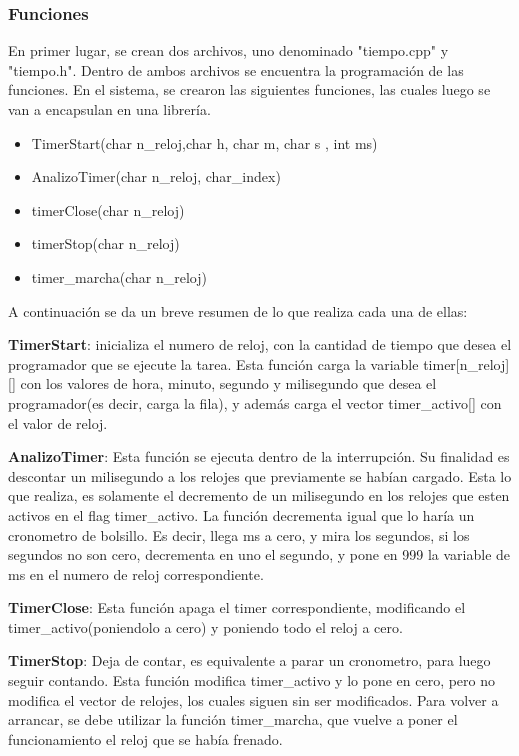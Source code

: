 \subsubsection{Funciones}

En primer lugar, se crean dos archivos, uno denominado "tiempo.cpp"  y "tiempo.h". Dentro de ambos archivos se encuentra la programación de las funciones. En el sistema, se crearon las siguientes funciones, las cuales luego se van a encapsulan en una librería.  

\begin{itemize}
\item TimerStart(char n\_reloj,char h, char m, char s , int ms)
\item AnalizoTimer(char n\_reloj, char\_index) 
\item timerClose(char n\_reloj) 
\item timerStop(char n\_reloj)
\item timer\_marcha(char n\_reloj) 
\end{itemize}

A continuación se da un breve resumen de lo que realiza cada una de ellas: 

\textbf{TimerStart}:  inicializa el numero de reloj, con la cantidad de tiempo que desea el programador que se ejecute la tarea. Esta función carga la variable timer[n\_reloj][] con los valores de hora, minuto, segundo y milisegundo que desea el programador(es decir, carga la fila), y además carga el vector timer\_activo[] con el valor de reloj. 

\textbf{AnalizoTimer}: Esta función se ejecuta dentro de la interrupción. Su finalidad es descontar un milisegundo a los relojes que previamente se habían cargado. Esta lo que realiza, es solamente el decremento de un milisegundo en los relojes que esten activos en el flag timer\_activo. La función decrementa igual que lo haría un cronometro de bolsillo. Es decir, llega ms a cero, y mira los segundos, si los segundos no son cero, decrementa en uno el segundo, y pone en 999 la variable de ms en el numero de reloj correspondiente.  

\textbf{TimerClose}: Esta función apaga el timer correspondiente, modificando el timer\_activo(poniendolo a cero) y poniendo todo el reloj a cero. 

\textbf{TimerStop}: Deja de contar, es equivalente a parar un cronometro, para luego seguir contando. Esta función modifica timer\_activo y lo pone en cero, pero no modifica el vector de relojes, los cuales siguen sin ser modificados. Para volver a arrancar, se debe utilizar la función timer\_marcha, que vuelve a poner el funcionamiento el reloj que se había frenado. 


